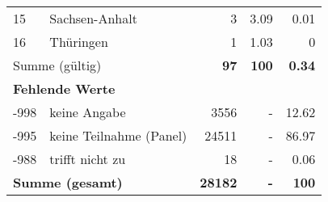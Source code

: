 \begin{longtable}{lXrrr}
     15 &
     \multicolumn{1}{X}{ Sachsen-Anhalt   } &


       \num{3} &
       \num[round-mode=places,round-precision=2]{3.09} &
         \num[round-mode=places,round-precision=2]{0.01} \\

     16 &
     \multicolumn{1}{X}{ Thüringen   } &


       \num{1} &
       \num[round-mode=places,round-precision=2]{1.03} &
         \num[round-mode=places,round-precision=2]{0} \\
     \midrule
     \multicolumn{2}{l}{Summe (gültig)} &
       \textbf{\num{97}} &
     \textbf{\num{100}} &
       \textbf{\num[round-mode=places,round-precision=2]{0.34}} \\
     \multicolumn{5}{l}{\textbf{Fehlende Werte}}\\
       -998 &
       keine Angabe &
         \num{3556} &
        - &
         \num[round-mode=places,round-precision=2]{12.62} \\
       -995 &
       keine Teilnahme (Panel) &
         \num{24511} &
        - &
         \num[round-mode=places,round-precision=2]{86.97} \\
       -988 &
       trifft nicht zu &
         \num{18} &
        - &
         \num[round-mode=places,round-precision=2]{0.06} \\
     \midrule
     \multicolumn{2}{l}{\textbf{Summe (gesamt)}} &
          \textbf{\num{28182}} &
        \textbf{-} &
        \textbf{\num{100}} \\
     \bottomrule
     \end{longtable}
     
